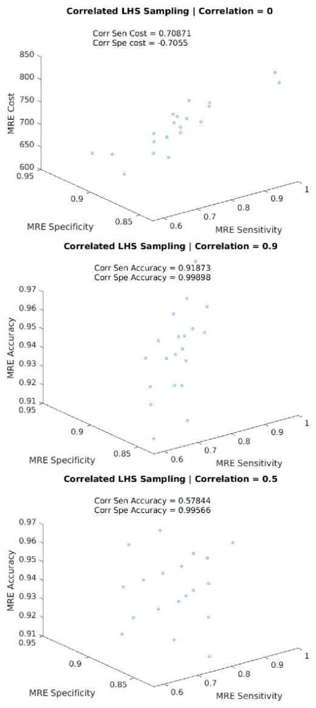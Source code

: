 \documentclass[aspectratio=1610]{beamer}
\begin{document}
\begin{frame}
\includegraphics[scale = .3]{mrecorr3}\\
\includegraphics[scale = .3]{mrecorr4}
\includegraphics[scale = .3]{mrecorr5}

\end{frame}
\end{document}

